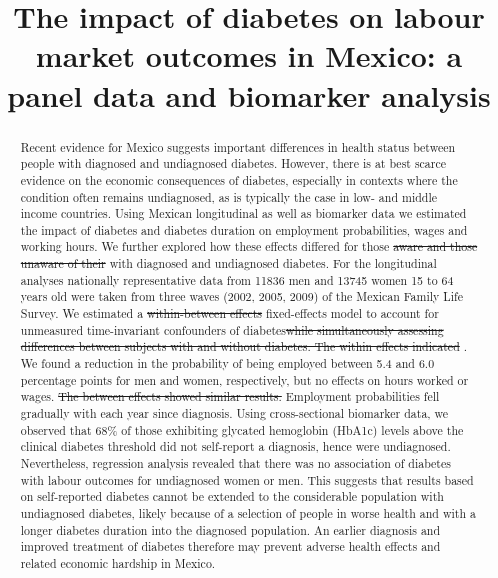 \documentclass[12pt,english]{article}
\providecommand{\DIFaddtex}[1]{{\protect\color{blue}#1}} %
\providecommand{\DIFdeltex}[1]{{\protect\color{red}\sout{#1}}}                      %
\providecommand{\DIFaddbegin}{} %
\providecommand{\DIFaddend}{} %
\providecommand{\DIFdelbegin}{} %
\providecommand{\DIFdelend}{} %
\providecommand{\DIFadd}[1]{\texorpdfstring{\DIFaddtex{#1}}{#1}} %
\providecommand{\DIFdel}[1]{\texorpdfstring{\DIFdeltex{#1}}{}} %
\begin{document}
	\title{The impact of diabetes on labour market outcomes in Mexico: a panel data and biomarker analysis}
	\author{}
	\DIFdelbegin %
\DIFdelend \DIFaddbegin 

	\DIFaddend \maketitle 
	\thispagestyle{empty}
	\clearpage

	
\begin{abstract}
Recent evidence for Mexico suggests important differences in health status between people with diagnosed and undiagnosed diabetes. However, there is at best scarce evidence on the economic consequences of diabetes, especially in contexts where the condition often remains undiagnosed, as is typically the case in low- and middle income countries. Using Mexican longitudinal as well as biomarker data we estimated the impact of diabetes and diabetes duration on employment probabilities, wages and working hours. We further explored how these effects differed for those \DIFdelbegin \DIFdel{aware and those unaware of their }\DIFdelend \DIFaddbegin \DIFadd{with diagnosed and undiagnosed }\DIFaddend diabetes. For the longitudinal analyses nationally representative data from 11836 men and 13745 women 15 to 64 years old were taken from three waves (2002, 2005, 2009) of the Mexican Family Life Survey. We estimated a \DIFdelbegin \DIFdel{within-between effects }\DIFdelend \DIFaddbegin \DIFadd{fixed-effects }\DIFaddend model to account for unmeasured time-invariant confounders of diabetes\DIFdelbegin \DIFdel{while simultaneously assessing differences between subjects with and without diabetes. The within effects indicated }\DIFdelend \DIFaddbegin \DIFadd{. We found }\DIFaddend a reduction in the probability of being employed between 5.4 and 6.0 percentage points for men and women, respectively, but no effects on hours worked or wages. \DIFdelbegin \DIFdel{The between effects showed similar results. }\DIFdelend Employment probabilities fell gradually with each year since diagnosis. Using cross-sectional biomarker data, we observed that 68\% of those exhibiting glycated hemoglobin (HbA1c) levels above the clinical diabetes threshold did not self-report a diagnosis, hence were undiagnosed. Nevertheless, regression analysis revealed that there was no association of diabetes with labour outcomes for undiagnosed women or men. This suggests that results based on self-reported diabetes cannot be extended to the considerable population with undiagnosed diabetes, likely because of a selection of people in worse health and with a longer diabetes duration into the diagnosed population. An earlier diagnosis and improved treatment of diabetes therefore may prevent adverse health effects and related economic hardship in Mexico.
\end{abstract}
\end{document}
